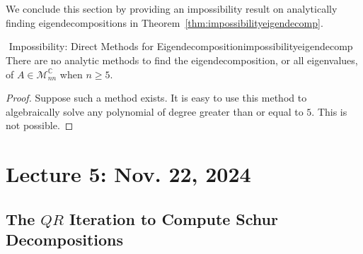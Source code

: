         \\
        \\
        We conclude this section by providing an impossibility result on analytically finding eigendecompositions in Theorem~\ref{thm:impossibilityeigendecomp}.
        \begin{theorem}{\Stop\,\,Impossibility: Direct Methods for Eigendecomposition}{impossibilityeigendecomp}
            There are no analytic methods to find the eigendecomposition, or all eigenvalues, of \(A\in\mathcal{M}_{nn}^\mathbb{C}\) when \(n\geq 5\).
            \begin{proof}
                Suppose such a method exists. It is easy to use this method to algebraically solve any polynomial of degree greater than or equal to \(5\). This is not possible.
            \end{proof}
        \end{theorem}

    \pagebreak

\section{Lecture 5: Nov. 22, 2024}

    \subsection{The \(QR\) Iteration to Compute Schur Decompositions}

